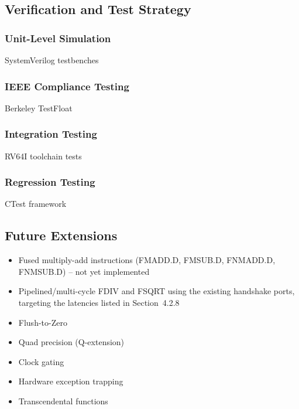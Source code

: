 \subsection{Verification and Test Strategy}

\subsubsection{Unit-Level Simulation}
SystemVerilog testbenches

\subsubsection{IEEE Compliance Testing}
Berkeley TestFloat

\subsubsection{Integration Testing}
RV64I toolchain tests

\subsubsection{Regression Testing}
CTest framework

\subsection{Future Extensions}
\begin{itemize}
\item Fused multiply-add instructions (FMADD.D, FMSUB.D, FNMADD.D, FNMSUB.D) -- not yet implemented
\item Pipelined/multi-cycle FDIV and FSQRT using the existing handshake ports, targeting the latencies listed in Section~4.2.8
\item Flush-to-Zero
\item Quad precision (Q-extension)
\item Clock gating
\item Hardware exception trapping
\item Transcendental functions
\end{itemize}
